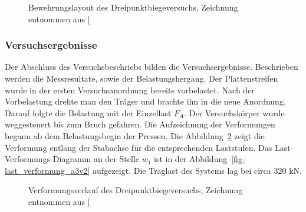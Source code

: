 \documentclass[
  11pt,
  letterpaper,
]{scrreprt}
\begin{document}
\begin{figure}[H]


\caption{\label{fig-bewehrung_a3v2}Bewehrungslayout des
Dreipunktbiegeversuchs, Zeichnung entnommen aus
{[}\citeproc{ref-jager_versuche_2006}{2}{]}}

\end{figure}%

\subsubsection{Versuchsergebnisse}\label{versuchsergebnisse}

Der Abschluss des Versuchsbeschriebs bilden die Versuchsergebnisse.
Beschrieben werden die Messresultate, sowie der Belastungshergang. Der
Plattenstreifen wurde in der ersten Versuchsanordnung bereits
vorbelastet. Nach der Vorbelastung drehte man den Träger und brachte ihn
in die neue Anordnung. Darauf folgte die Belastung mit der Einzellast
\(F_A\). Der Versuchskörper wurde weggesteuert bis zum Bruch gefahren.
Die Aufzeichnung der Verformungen begann ab dem Belastungsbegin der
Pressen. Die Abbildung~\ref{fig-verformungslinie_a3v2} zeigt die
Verformung entlang der Stabachse für die entsprechenden Laststufen. Das
Last-Verformungs-Diagramm an der Stelle \(w_1\) ist in der
Abbildung~\ref{fig-last_verformung_a3v2} aufgezeigt. Die Traglast des
Systems lag bei circa \(320\) kN.

\begin{figure}[H]


\caption{\label{fig-verformungslinie_a3v2}Verformungsverlauf des
Dreipunktbiegeversuchs, Zeichnung entnommen aus
{[}\citeproc{ref-jager_versuche_2006}{2}{]}}

\end{figure}%
\end{document}

